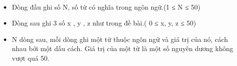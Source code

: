  
\begin{itemize}
	\item Dòng đầu ghi số N, số từ có nghĩa trong ngôn ngữ.(1 ≤ N ≤ 50)
	\item Dòng sau ghi 3 số x , y , z như trong đề bài.( 0 ≤ x, y, z ≤ 50)
	\item N dòng sau, mỗi dòng ghi một từ thuộc ngôn ngữ và giá trị của nó, cách nhau bởi một dấu cách. Giá trị của một từ là một số nguyên dương không vượt quá 50.
\end{itemize}